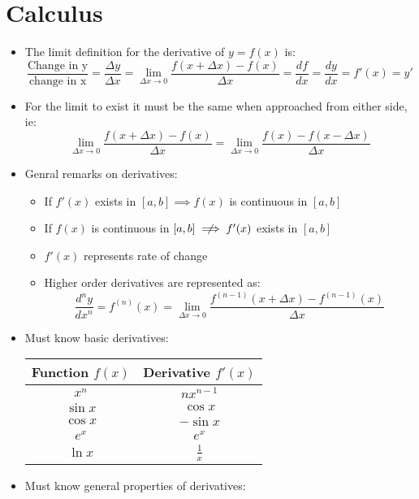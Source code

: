 \documentclass{article}
\begin{document}
\section*{Calculus}

\begin{itemize}
\item The limit definition for the derivative of \(y=f(x)\) is:
\[\frac{\text{Change in y}}{\text{change in x}}=\frac{\Delta y}{\Delta x}=\lim_{\Delta x \to 0}\frac{f(x+\Delta x)-f(x)}{\Delta x}=\frac{df}{dx}=\frac{dy}{dx}=f'(x)=y'\]
\item For the limit to exist it must be the same when approached from either side, ie:
\[\lim_{\Delta x \to 0}\frac{f(x+\Delta x)-f(x)}{\Delta x}=\lim_{\Delta x \to 0}\frac{f(x)-f(x-\Delta x)}{\Delta x}\]
\item Genral remarks on derivatives:
\begin{itemize}
\item If \(f'(x)\) exists in \([a,b]\implies f(x)\) is continuous in \([a,b]\)
\item If \(f(x)\) is continuous in \([a,b]\centernot \implies f'(x)\) exists in \([a,b]\)
\item \(f'(x)\) represents rate of change
\item Higher order derivatives are represented as:
\[\frac{d^ny}{dx^n}=f^{(n)}(x)=\lim_{\Delta x \to 0}\frac{f^{(n-1)}(x+\Delta x)-f^{(n-1)}(x)}{\Delta x}\]
\end{itemize}
\item Must know basic derivatives:
\begin{center}
\begin{tabular}{|c|c|}\hline
Function \(f(x)\) & Derivative \(f'(x)\)\\ \hline
\(x^n\) & \(nx^{n-1}\)\\ \hline
\(\sin x\) & \(\cos x\)\\ \hline
\(\cos x\) & \(-\sin x\)\\ \hline
\(e^x\) & \(e^x\)\\ \hline
\(\ln x\) & \(\frac{1}{x}\)\\ \hline
\end{tabular}
\end{center}
\item Must know general properties of derivatives:
\begin{itemize}


\end{itemize}
\end{itemize}
\end{document}
